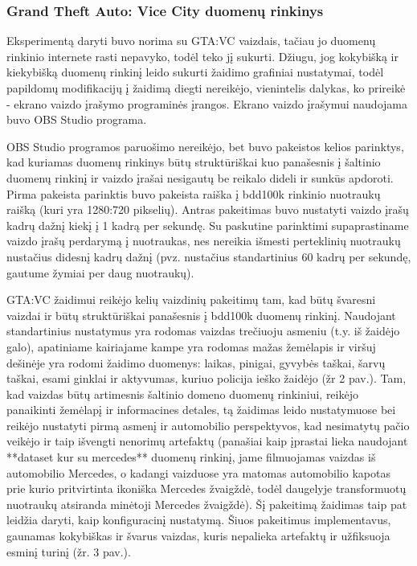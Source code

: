 \documentclass{VUMIFPSkursinis}
\begin{document}
        \subsubsection{Grand Theft Auto: Vice City duomenų rinkinys}
            Eksperimentą daryti buvo norima su GTA:VC vaizdais, tačiau jo duomenų rinkinio internete rasti nepavyko, todėl teko jį sukurti. Džiugu, jog kokybišką ir kiekybišką duomenų rinkinį leido sukurti žaidimo grafiniai nustatymai, todėl papildomų modifikacijų į žaidimą diegti nereikėjo, vienintelis dalykas, ko prireikė - ekrano vaizdo įrašymo programinės įrangos. Ekrano vaizdo įrašymui naudojama buvo OBS Studio programa.
            
            OBS Studio programos paruošimo nereikėjo, bet buvo pakeistos kelios parinktys, kad kuriamas duomenų rinkinys būtų struktūriškai kuo panašesnis į šaltinio duomenų rinkinį ir vaizdo įrašai nesigautų be reikalo dideli ir sunkūs apdoroti. Pirma pakeista parinktis buvo pakeista raiška į bdd100k rinkinio nuotraukų raišką (kuri yra 1280:720 pikselių). Antras pakeitimas buvo nustatyti vaizdo įrašų kadrų dažnį kiekį į 1 kadrą per sekundę. Su paskutine parinktimi supaprastiname vaizdo įrašų perdarymą į nuotraukas, nes nereikia išmesti perteklinių nuotraukų nustačius didesnį kadrų dažnį (pvz. nustačius standartinius 60 kadrų per sekundę, gautume žymiai per daug nuotraukų).
            
            GTA:VC žaidimui reikėjo kelių vaizdinių pakeitimų tam, kad būtų švaresni vaizdai ir būtų struktūriškai panašesnis į bdd100k duomenų rinkinį. Naudojant standartinius nustatymus yra rodomas vaizdas trečiuoju asmeniu (t.y. iš žaidėjo galo), apatiniame kairiajame kampe yra rodomas mažas žemėlapis ir viršuj dešinėje yra rodomi žaidimo duomenys: laikas, pinigai, gyvybės taškai, šarvų taškai, esami ginklai ir aktyvumas, kuriuo policija ieško žaidėjo (žr 2 pav.). Tam, kad vaizdas būtų artimesnis šaltinio domeno duomenų rinkiniui, reikėjo panaikinti žemėlapį ir informacines detales, tą žaidimas leido nustatymuose bei reikėjo nustatyti pirmą asmenį ir automobilio perspektyvos, kad nesimatytų pačio veikėjo ir taip išvengti nenorimų artefaktų (panašiai kaip įprastai lieka naudojant **dataset kur su mercedes** duomenų rinkinį, jame filmuojamas vaizdas iš automobilio Mercedes, o kadangi vaizduose yra matomas automobilio kapotas prie kurio pritvirtinta ikoniška Mercedes žvaigždė, todėl daugelyje transformuotų nuotraukų atsiranda minėtoji Mercedes žvaigždė). Šį pakeitimą žaidimas taip pat leidžia daryti, kaip konfiguracinį nustatymą. Šiuos pakeitimus implementavus, gaunamas kokybiškas ir švarus vaizdas, kuris nepalieka artefaktų ir užfiksuoja esminį turinį (žr. 3 pav.).
            
\end{document}

